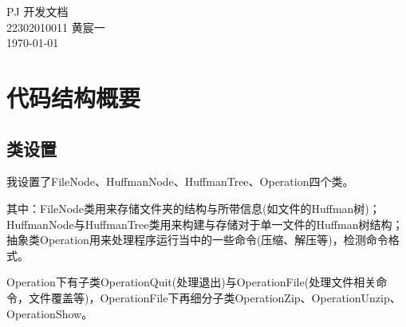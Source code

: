 \documentclass[11pt,a4paper]{article}
\begin{document}
\pagestyle{empty}
\begin{titlepage}
    \vspace*{\fill}
    \begin{center}
        \Huge{PJ 开发文档}\\[0.5cm]
        \Large{22302010011 黄宸一}\\[0.4cm]
        \today
    \end{center}
    \vspace*{\fill}
\end{titlepage}
\section{代码结构概要}
\subsection*{类设置}
\par{我设置了FileNode、HuffmanNode、HuffmanTree、Operation四个类。}
\par{其中：FileNode类用来存储文件夹的结构与所带信息(如文件的Huffman树)；HuffmanNode与HuffmanTree类用来构建与存储对于单一文件的Huffman树结构；抽象类Operation用来处理程序运行当中的一些命令(压缩、解压等)，检测命令格式。}
\par{Operation下有子类OperationQuit(处理退出)与OperationFile(处理文件相关命令，文件覆盖等)，OperationFile下再细分子类OperationZip、OperationUnzip、OperationShow。}
\end{document}
